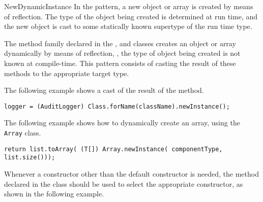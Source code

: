 \begin{pattern}{NewDynamicInstance}
In the \thisp{} pattern, a new 
object or array is created by means of reflection.
The type of the object being created is determined at run time,
and the new object is cast to some statically known supertype of the run time type.

The  method family declared in the ,
and 
classes creates an object or array dynamically by means of reflection, \ie,
the type of object being created is not known at compile-time.
This pattern consists of casting the result of these methods to the appropriate target type.

\instances{}
The following example%
\def\urlvar{http://bit.ly/apache_hadoop_2HC3IPg}
shows a cast of the result of the 
method.

\begin{verbatim}
logger = (AuditLogger) Class.forName(className).newInstance();
\end{verbatim}

The following example%
\def\urlvar{http://bit.ly/neo4j_neo4j_2Hp5Hqc}
shows how to dynamically create an array, using the \texttt{Array} class.

\begin{verbatim}
return list.toArray( (T[]) Array.newInstance( componentType, list.size()));
\end{verbatim}

Whenever a constructor other than the default constructor is needed,
the  method declared in the  class
should be used to select the appropriate constructor,
as shown in the following example.%
\def\urlvar{http://bit.ly/gradle_gradle_2HsUgOo}


\end{pattern}
